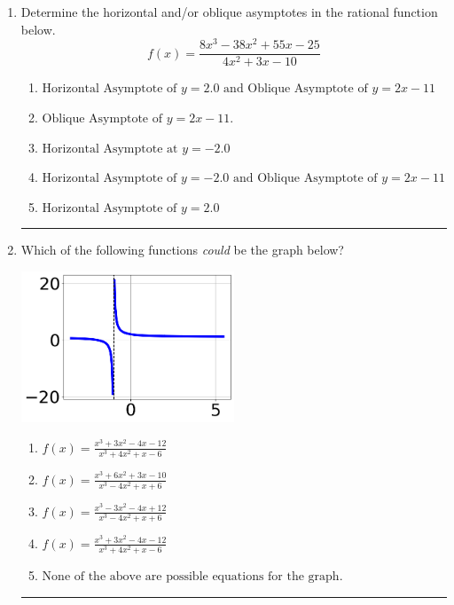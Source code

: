 \documentclass[14pt]{extbook}
\newcommand{\litem}[1]{\item#1\hspace*{-1cm}\rule{\textwidth}{0.4pt}}
\begin{document}
\begin{enumerate}
{\begin{enumerate}[label=\Alph*.]
\end{enumerate} }
\litem{
Determine the horizontal and/or oblique asymptotes in the rational function below.\[ f(x) = \frac{8x^{3} -38 x^{2} +55 x -25}{4x^{2} +3 x -10} \]\begin{enumerate}[label=\Alph*.]
\item \( \text{Horizontal Asymptote of } y = 2.0 \text{ and Oblique Asymptote of } y = 2x -11 \)
\item \( \text{Oblique Asymptote of } y = 2x -11. \)
\item \( \text{Horizontal Asymptote at } y = -2.0 \)
\item \( \text{Horizontal Asymptote of } y = -2.0 \text{ and Oblique Asymptote of } y = 2x -11 \)
\item \( \text{Horizontal Asymptote of } y = 2.0  \)

\end{enumerate} }
\litem{
Which of the following functions \textit{could} be the graph below?
\begin{center}
    \includegraphics[width=0.5\textwidth]{../Figures/identifyGraphOfRationalFunctionC.png}
\end{center}
\begin{enumerate}[label=\Alph*.]
\item \( f(x)=\frac{x^{3} +3 x^{2} -4 x -12}{x^{3} +4 x^{2} +x -6} \)
\item \( f(x)=\frac{x^{3} +6 x^{2} +3 x -10}{x^{3} -4 x^{2} +x + 6} \)
\item \( f(x)=\frac{x^{3} -3 x^{2} -4 x + 12}{x^{3} -4 x^{2} +x + 6} \)
\item \( f(x)=\frac{x^{3} +3 x^{2} -4 x -12}{x^{3} +4 x^{2} +x -6} \)
\item \( \text{None of the above are possible equations for the graph.} \)

\end{enumerate} }
\end{enumerate}
\end{document}

